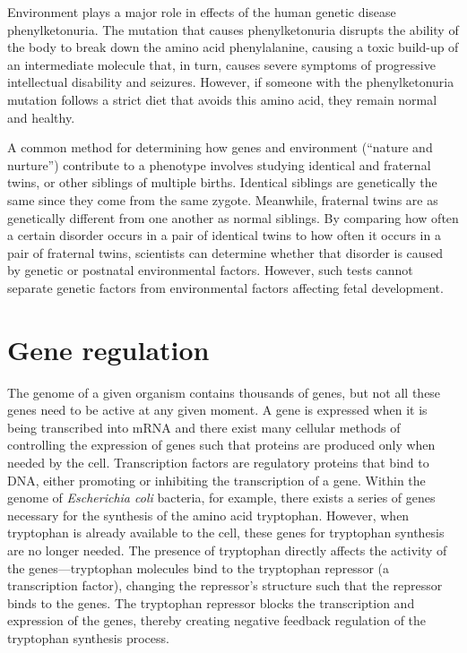 Environment plays a major role in effects of the human genetic disease phenylketonuria. The mutation that causes phenylketonuria disrupts the ability of the body to break down the amino acid phenylalanine, causing a toxic build-up of an intermediate molecule that, in turn, causes severe symptoms of progressive intellectual disability and seizures. However, if someone with the phenylketonuria mutation follows a strict diet that avoids this amino acid, they remain normal and healthy.

A common method for determining how genes and environment (``nature and nurture'') contribute to a phenotype involves studying identical and fraternal twins, or other siblings of multiple births. Identical siblings are genetically the same since they come from the same zygote. Meanwhile, fraternal twins are as genetically different from one another as normal siblings. By comparing how often a certain disorder occurs in a pair of identical twins to how often it occurs in a pair of fraternal twins, scientists can determine whether that disorder is caused by genetic or postnatal environmental factors. However, such tests cannot separate genetic factors from environmental factors affecting fetal development.

\hypertarget{gene-regulation}{%
\section{Gene regulation}\label{gene-regulation}}

The genome of a given organism contains thousands of genes, but not all these genes need to be active at any given moment. A gene is expressed when it is being transcribed into mRNA and there exist many cellular methods of controlling the expression of genes such that proteins are produced only when needed by the cell. Transcription factors are regulatory proteins that bind to DNA, either promoting or inhibiting the transcription of a gene. Within the genome of \emph{Escherichia coli} bacteria, for example, there exists a series of genes necessary for the synthesis of the amino acid tryptophan. However, when tryptophan is already available to the cell, these genes for tryptophan synthesis are no longer needed. The presence of tryptophan directly affects the activity of the genes---tryptophan molecules bind to the tryptophan repressor (a transcription factor), changing the repressor's structure such that the repressor binds to the genes. The tryptophan repressor blocks the transcription and expression of the genes, thereby creating negative feedback regulation of the tryptophan synthesis process.



